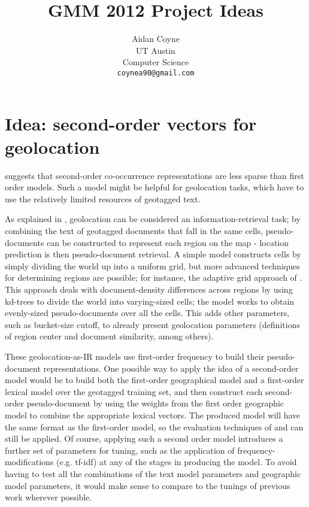 \documentclass[11pt]{article}
\title{GMM 2012 Project Ideas}
\author{Aidan Coyne \\
    UT Austin\\
    Computer Science\\
  {\tt coynea90@gmail.com} \\}
\date{}
\begin{document}
\maketitle

\section{Idea: second-order vectors for geolocation}
\cite{schutze98} suggests that second-order co-occurrence representations are
less sparse than first order models.
Such a model might be helpful for geolocation tasks, which have to use the
relatively limited resources of geotagged text.

As explained in \cite{skiles12}, geolocation can be considered an
information-retrieval task; by combining the text of geotagged documents that
fall in the same cells, pseudo-documents can be constructed to represent each
region on the map - location prediction is then pseudo-document retrieval.
A simple model constructs cells by simply dividing the world up into a uniform grid,
but more advanced techniques for determining regions are possible;
for instance, the adaptive grid approach of \cite{adaptivegrid}.
This approach deals with document-density differences across regions by using
kd-trees to divide the world into varying-sized cells; the model works to
obtain evenly-sized pseudo-documents over all the cells. This adds other
parameters, such as bucket-size cutoff, to already present geolocation
parameters (definitions of region center and document similarity, among others).

These geolocation-as-IR models use first-order frequency to build their
pseudo-document representations. One possible way to apply the idea of a
second-order model would be to build both the first-order geographical model
and a first-order lexical model over the geotagged training set, and then
construct each second-order pseudo-document by using the weights from the first
order geographic model to combine the appropriate lexical vectors. 
The produced model will have the same format as the first-order model, so the
evaluation techniques of \cite{skiles12} and \cite{adaptivegrid} can still be
applied.
Of course, applying such a second order model introduces a further set of
parameters for tuning, such as the application of frequency-modifications
(e.g. tf-idf) at any of the stages in producing the model.
To avoid having to test all the combinations of the text model parameters and
geographic model parameters, it would make sense to compare to the tunings of
previous work wherever possible.





\end{document}
